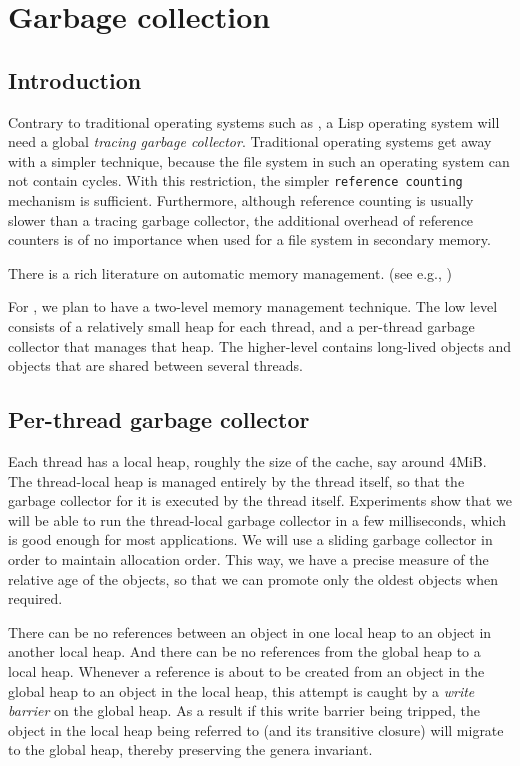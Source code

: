 \chapter{Garbage collection}
\label{chap-garbage-collection}

\section{Introduction}

Contrary to traditional operating systems such as \unix{}, a Lisp
operating system will need a global \emph{tracing garbage collector}.
Traditional operating systems get away with a simpler technique,
because the file system in such an operating system can not contain
cycles.  With this restriction, the simpler \texttt{reference
  counting} mechanism is sufficient.  Furthermore, although reference
counting is usually slower than a tracing garbage collector, the
additional overhead of reference counters is of no importance when
used for a file system in secondary memory.

There is a rich literature on automatic memory management.
(see e.g., \cite{Jones:2011:GCH:2025255})

For \sysname{}, we plan to have a two-level memory management
technique.  The low level consists of a relatively small heap for each
thread, and a per-thread garbage collector that manages that heap.
The higher-level contains long-lived objects and objects that are
shared between several threads.

\section{Per-thread garbage collector}

Each thread has a local heap, roughly the size of the cache, say
around 4MiB.  The thread-local heap is managed entirely by the thread
itself, so that the garbage collector for it is executed by the thread
itself.  Experiments show that we will be able to run the thread-local
garbage collector in a few milliseconds, which is good enough for most
applications.  We will use a sliding garbage collector in order to
maintain allocation order.  This way, we have a precise measure of the
relative age of the objects, so that we can promote only the oldest
objects when required. 

There can be no references between an object in one local heap to an
object in another local heap.  And there can be no references from the
global heap to a local heap.  Whenever a reference is about to be
created from an object in the global heap to an object in the local
heap, this attempt is caught by a \emph{write barrier} on the global
heap.  As a result if this write barrier being tripped, the object in
the local heap being referred to (and its transitive closure) will
migrate to the global heap, thereby preserving the genera invariant.

